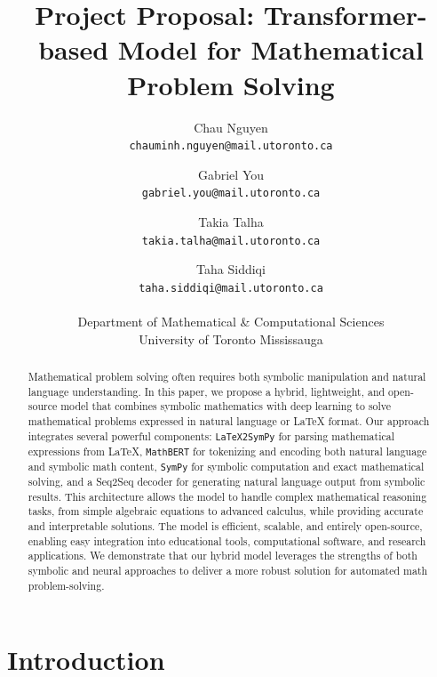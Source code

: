 \documentclass{article}
\title{Project Proposal: Transformer-based Model for Mathematical Problem Solving}
\author{%
    Chau Nguyen \\
    \texttt{chauminh.nguyen@mail.utoronto.ca} \\
    \and
    Gabriel You \\
    \texttt{gabriel.you@mail.utoronto.ca} \\
    \and
    Takia Talha \\
    \texttt{takia.talha@mail.utoronto.ca} \\
    \and
    Taha Siddiqi \\
    \texttt{taha.siddiqi@mail.utoronto.ca} \\
    \\
    Department of Mathematical \& Computational Sciences \\
    University of Toronto Mississauga
}
\begin{document}
\maketitle


\begin{abstract}


  Mathematical problem solving often requires both symbolic manipulation and natural language understanding. In this paper, we propose a hybrid, lightweight, and open-source model that combines symbolic mathematics with deep learning to solve mathematical problems expressed in natural language or LaTeX format. Our approach integrates several powerful components: \texttt{LaTeX2SymPy} for parsing mathematical expressions from LaTeX, \texttt{MathBERT} for tokenizing and encoding both natural language and symbolic math content, \texttt{SymPy} for symbolic computation and exact mathematical solving, and a Seq2Seq decoder for generating natural language output from symbolic results. This architecture allows the model to handle complex mathematical reasoning tasks, from simple algebraic equations to advanced calculus, while providing accurate and interpretable solutions. The model is efficient, scalable, and entirely open-source, enabling easy integration into educational tools, computational software, and research applications. We demonstrate that our hybrid model leverages the strengths of both symbolic and neural approaches to deliver a more robust solution for automated math problem-solving.
  \end{abstract}
\section{Introduction}
\end{document}
